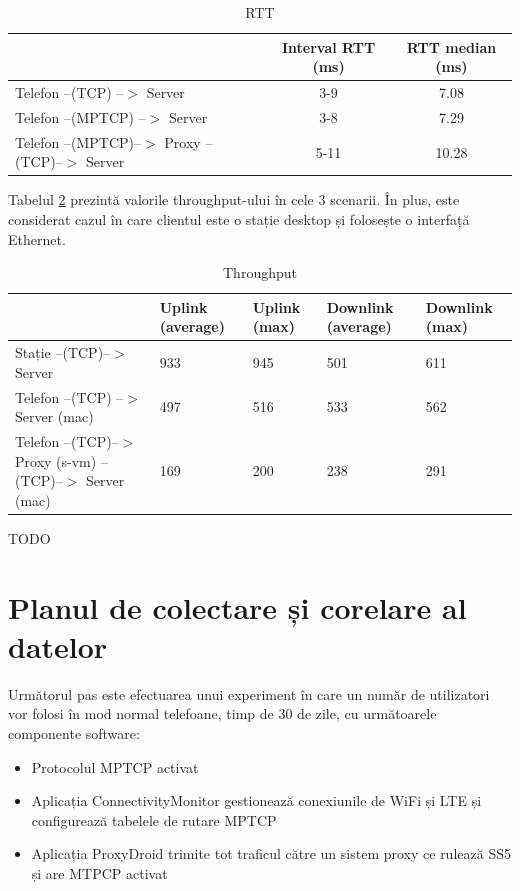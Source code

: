 \begin{table}[h]
\centering
\caption{RTT}
\label{tab:rtt}
\begin{tabular}{l | c c}
\hline
& Interval RTT (ms)  & RTT median (ms) \\
\hline
Telefon --(TCP) --$>$ Server  & 3-9 &  7.08  \\
Telefon --(MPTCP) --$>$ Server  & 3-8  & 7.29 \\
Telefon --(MPTCP)--$>$ Proxy --(TCP)--$>$ Server & 5-11  & 10.28 \\
\hline
\end{tabular}
\end{table}

Tabelul \ref{tab:throughput} prezintă valorile throughput-ului în cele 3 scenarii. În plus, este considerat cazul în care clientul este o stație desktop și folosește o interfață Ethernet.

\begin{table}[h]
\centering
\caption{Throughput}
\label{tab:throughput}
\begin{tabular}{l | p{1.5cm} p{1.5cm} p{1.5cm} p{1.5cm}}
\hline
& Uplink (average) & Uplink (max) & Downlink (average) & Downlink (max) \\
\hline
Stație --(TCP)--$>$ Server & 933 & 945 & 501 & 611 \\
Telefon --(TCP) --$>$ Server (mac) & 497 & 516 & 533 & 562 \\
Telefon --(TCP)--$>$ Proxy (s-vm) --(TCP)--$>$ Server (mac) & 169  & 200  &  238 & 291   \\

\hline
\end{tabular}
\end{table}

TODO

\section{Planul de colectare și corelare al datelor}

Următorul pas este efectuarea unui experiment în care un număr de utilizatori vor folosi în mod normal telefoane, timp de 30 de zile, cu următoarele componente software:
\begin{itemize}
	\item Protocolul MPTCP activat
	\item Aplicația ConnectivityMonitor gestionează conexiunile de WiFi și LTE și configurează tabelele de rutare MPTCP
	\item Aplicația ProxyDroid trimite tot traficul către un sistem proxy ce rulează SS5 și are MTPCP activat 
\end{itemize}

